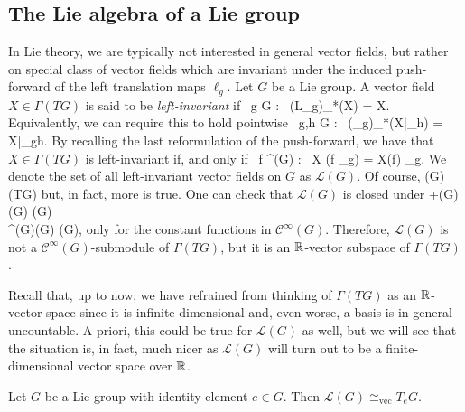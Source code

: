\subsection{The Lie algebra of a Lie group}

In Lie theory, we are typically not interested in general vector fields, but rather on special class of vector fields which are invariant under the induced push-forward of the left translation maps $\ell_g$.
\bd
Let $G$ be a Lie group. A vector field $X\in\Gamma(TG)$ is said to be \emph{left-invariant} if
\bse
\forall \, g \in G  : \ (L_g)_*(X) = X.
\ese
Equivalently, we can require this to hold pointwise
\bse
\forall \, g,h \in G : \ (\ell_g)_*(X|_h) = X|_{gh}.
\ese
\ed
By recalling the last reformulation of the push-forward, we have that $X\in\Gamma(TG)$ is left-invariant if, and only if
\bse
\forall \, f \in {}^\infty(G) : \ X (f \circ \ell_g) = X(f) \circ \ell_g.
\ese
We denote the set of all left-invariant vector fields on $G$ as $\mathcal{L}(G)$. Of course,
\bse
{}(G)\se\Gamma(TG)
\ese
but, in fact, more is true. One can check that $\mathcal{L}(G)$ is closed under 
+\cl {}(G)\times {}(G) \to {}(G)\\
\cdot  \cl {}^\infty(G)\times {}(G) \to {}(G),
\ei
only for the constant functions in $\mathcal{C}^\infty(G)$. Therefore, $\mathcal{L}(G)$ is not a $\mathcal{C}^\infty(G)$-submodule of $\Gamma(TG)$, but it is an $\mathbb{R}$-vector subspace of $\Gamma(TG)$.

Recall that, up to now, we have refrained from thinking of $\Gamma(TG)$ as an $\mathbb{R}$-vector space since it is infinite-dimensional and, even worse, a basis is in general uncountable. A priori, this could be true for $\mathcal{L}(G)$ as well, but we will see that the situation is, in fact, much nicer as $\mathcal{L}(G)$ will turn out to be a finite-dimensional vector space over $\mathbb{R}$. 

\begin{theorem}
Let $G$ be a Lie group with identity element $e\in G$. Then $\mathcal{L}(G)\cong_\mathrm{vec} T_eG$.
\end{theorem}

